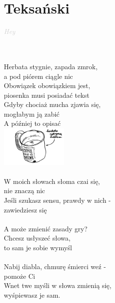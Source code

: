 \documentclass[a5paper, 10pt]{book}
\begin{document}
\section{Teksański}\textcolor{lightgray}{\textit{Hey}}\\~\\
\begin{minipage}[t]{0.7\textwidth}
  ~\\ %
  Herbata stygnie, zapada zmrok,\\
  a pod piórem ciągle nic\\
  Obowiązek obowiązkiem jest,\\
  piosenka musi posiadać tekst\\
  Gdyby chociaż mucha zjawia się,\\
  mogłabym ją zabić\\
  A później to opisać\\
  \includegraphics[height = 2cm,right]{teksanski.png}\vspace*{-2.1cm}\\
  \\
  W moich słowach słoma czai się,\\
  nie znaczą nic\\
  Jeśli szukasz sensu, prawdy w nich -\\
  zawiedziesz się\\
  \\
  A może zmienić zasady gry?\\
  Chcesz usłyszeć słowa,\\
  to sam je sobie wymyśl\\
  \\
  Nabij diabla, chmurę śmierci weź -\\
  pomoże Ci \\
  Wnet twe myśli w słowa zmienią się,\\
  wyśpiewasz je sam.\\

\end{minipage}
\end{document}
